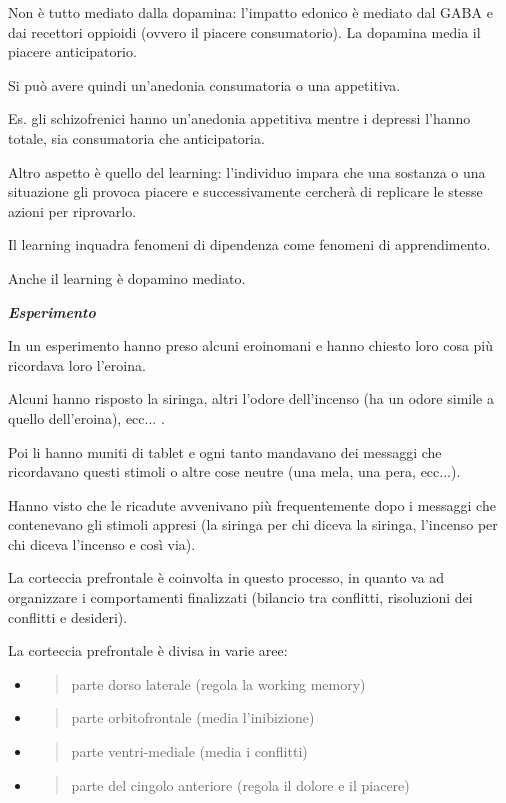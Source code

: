 \documentclass[]{article}
\begin{document}
Non è tutto mediato dalla dopamina: l'impatto edonico è mediato dal GABA
e dai recettori oppioidi (ovvero il piacere consumatorio). La dopamina
media il piacere anticipatorio.

Si può avere quindi un'anedonia consumatoria o una appetitiva.

Es. gli schizofrenici hanno un'anedonia appetitiva mentre i depressi
l'hanno totale, sia consumatoria che anticipatoria.

Altro aspetto è quello del learning: l'individuo impara che una sostanza
o una situazione gli provoca piacere e successivamente cercherà di
replicare le stesse azioni per riprovarlo.

Il learning inquadra fenomeni di dipendenza come fenomeni di
apprendimento.

Anche il learning è dopamino mediato.

\emph{\textbf{Esperimento }}

In un esperimento hanno preso alcuni eroinomani e hanno chiesto loro
cosa più ricordava loro l'eroina.

Alcuni hanno risposto la siringa, altri l'odore dell'incenso (ha un
odore simile a quello dell'eroina), ecc... .

Poi li hanno muniti di tablet e ogni tanto mandavano dei messaggi che
ricordavano questi stimoli o altre cose neutre (una mela, una pera,
ecc...).

Hanno visto che le ricadute avvenivano più frequentemente dopo i
messaggi che contenevano gli stimoli appresi (la siringa per chi diceva
la siringa, l'incenso per chi diceva l'incenso e così via).

La corteccia prefrontale è coinvolta in questo processo, in quanto va ad
organizzare i comportamenti finalizzati (bilancio tra conflitti,
risoluzioni dei conflitti e desideri).

La corteccia prefrontale è divisa in varie aree:

\begin{itemize}
\item
  \begin{quote}
  parte dorso laterale (regola la working memory)
  \end{quote}
\item
  \begin{quote}
  parte orbitofrontale (media l'inibizione)
  \end{quote}
\item
  \begin{quote}
  parte ventri-mediale (media i conflitti)
  \end{quote}
\item
  \begin{quote}
  parte del cingolo anteriore (regola il dolore e il piacere)
  \end{quote}
\end{itemize}
\end{document}
